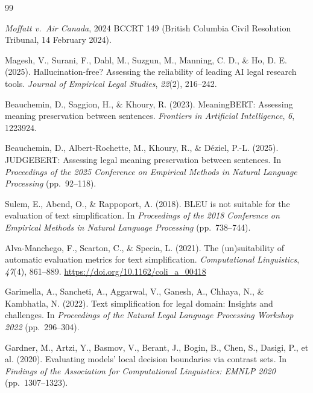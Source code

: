 
\begin{thebibliography}{99}

\textit{Moffatt v.\ Air Canada}, 2024 BCCRT 149 (British Columbia Civil
Resolution Tribunal, 14 February 2024).

Magesh, V., Surani, F., Dahl, M., Suzgun, M., Manning, C. D., \& Ho, D. E.
(2025). Hallucination-free? Assessing the reliability of leading AI legal
research tools. \textit{Journal of Empirical Legal Studies}, \textit{22}(2),
216--242.

Beauchemin, D., Saggion, H., \& Khoury, R. (2023). MeaningBERT: Assessing
meaning preservation between sentences. \textit{Frontiers in Artificial
Intelligence}, \textit{6}, 1223924.

Beauchemin, D., Albert-Rochette, M., Khoury, R., \& D\'eziel, P.-L. (2025).
JUDGEBERT: Assessing legal meaning preservation between sentences. In
\textit{Proceedings of the 2025 Conference on Empirical Methods in Natural
Language Processing} (pp.~92--118).

Sulem, E., Abend, O., \& Rappoport, A. (2018). BLEU is not suitable for the
evaluation of text simplification. In \textit{Proceedings of the 2018 Conference
on Empirical Methods in Natural Language Processing} (pp.~738--744).

Alva-Manchego, F., Scarton, C., \& Specia, L. (2021). The (un)suitability of
automatic evaluation metrics for text simplification. \textit{Computational
Linguistics}, \textit{47}(4), 861--889. \url{https://doi.org/10.1162/coli_a_00418}

Garimella, A., Sancheti, A., Aggarwal, V., Ganesh, A., Chhaya, N., \&
Kambhatla, N. (2022). Text simplification for legal domain: Insights and
challenges. In \textit{Proceedings of the Natural Legal Language Processing
Workshop 2022} (pp.~296--304).

Gardner, M., Artzi, Y., Basmov, V., Berant, J., Bogin, B., Chen, S., Dasigi, P.,
et al. (2020). Evaluating models' local decision boundaries via contrast sets.
In \textit{Findings of the Association for Computational Linguistics: EMNLP
2020} (pp.~1307--1323).


\end{thebibliography}
